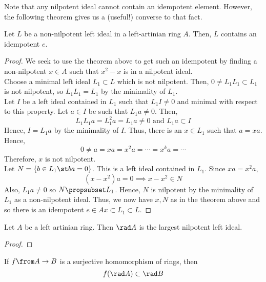 \documentclass[11pt,leqno,oneside]{amsbook}
\numberwithin{thm}{section}
\begin{document}
\begin{rmk}
  Note that any nilpotent ideal cannot contain an idempotent
  element. However, the following theorem gives us a (useful!)
  converse to that fact.
\end{rmk}
\begin{thm}\label{artinian-non-nilp-ideal-has-idem}
  Let \(L\) be a non-nilpotent left ideal in a left-artinian ring
  \(A\). Then, \(L\) contains an idempotent \(e\).
\end{thm}
\begin{proof}
  We seek to use the theorem above to get such an idempotent by
  finding a non-nilpotent \(x \in A\) such that \(x^2-x\) is in a
  nilpotent ideal. \\

  Choose a minimal left ideal \(L_1 \subset L\) which is not
  nilpotent. Then, \(0 \neq L_1 L_1 \subset L_1\) is not nilpotent, so
  \(L_1 L_1 = L_1\) by the minimality of \(L_1\). \\

  Let \(I\) be a left ideal contained in \(L_1\) such that \(L_1 I
  \neq 0\) and minimal with respect to this property. Let \(a \in I\)
  be such that \(L_1 a \neq 0\). Then, \[
    L_1 L_1 a = L_1^2 a = L_1 a \neq 0 \text{ and } L_1 a \subset I
  \]
  Hence, \(I = L_1 a\) by the minimality of \(I\). Thus, there is an
  \(x \in L_1\) such that \(a=xa\). Hence, \[
    0 \neq a = xa = x^2 a = \cdots = x^k a = \cdots
  \]
  Therefore, \(x\) is not nilpotent. \\

  Let \(N = \{b \in L_1 \st ba = 0\}\). This is a left ideal contained
  in
  \(L_1\). Since \(xa = x^2 a\), \[
    (x-x^2)a = 0 \implies x-x^2 \in N
  \]
  Also, \(L_1 a \neq 0\) so \(N \propsubset L_1\). Hence, \(N\) is
  nilpotent by the minimality of \(L_1\) as a non-nilpotent
  ideal. Thus, we now have \(x,N\) as in the theorem above and so
  there is an idempotent \(e \in Ax \subset L_1 \subset L\).
\end{proof}
\begin{thm}\label{for-artinian-rad-is-largest-nilp-ideal}
  Let \(A\) be a left artinian ring. Then \(\rad A\) is the largest
  nilpotent left ideal.
\end{thm}
\begin{proof}
  
\end{proof}
\begin{prop}
  If \(f \from A \to B\) is a surjective homomorphism of rings,
  then \[
    f(\rad A) \subset \rad B
  \]
\end{prop}
\end{document}
